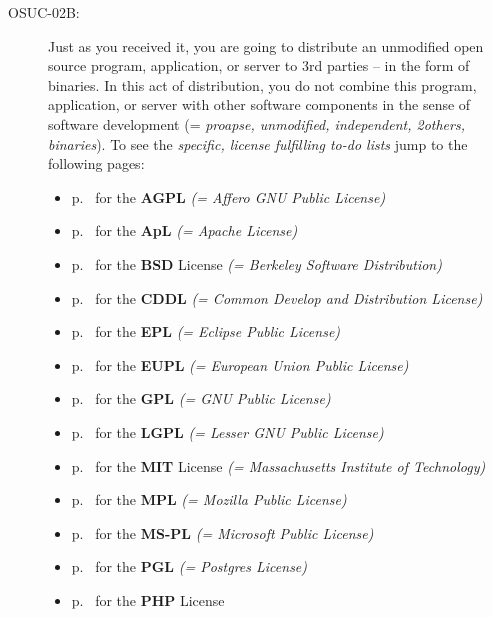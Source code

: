 \begin{description}
\item[OSUC-02B:]\label{OSUC-02B-DEF} Just as you received it, you are going to
distribute an unmodified open source program, application, or server to 3rd
parties -- in the form of binaries. In this act of distribution, you do not
combine this program, application, or server with other software components in
the sense of software development (= \textit{proapse, unmodified, independent,
2others, binaries}). To see the \textit{specific, license fulfilling to-do
lists} jump to the following pages:
   \begin{itemize}
    \item p.\ \pageref{OSUC-02B-AGPL} for the \textbf{AGPL}
      \textit{(= Affero GNU Public License)} 
    \item p.\ \pageref{OSUC-02B-Apache20} for the \textbf{ApL}
      \textit{(= Apache License)}
    \item p.\ \pageref{OSUC-02B-BSD} for the \textbf{BSD} License
      \textit{(= Berkeley Software Distribution)}
    \item p.\ \pageref{OSUC-02B-CDDL} for the \textbf{CDDL}
      \textit{(= Common Develop and Distribution License)}  
    \item p.\ \pageref{OSUC-02B-EPL} for the \textbf{EPL}
      \textit{(= Eclipse Public License)}     
    \item p.\ \pageref{OSUC-02B-EUPL} for the \textbf{EUPL}
      \textit{(= European Union Public License)} 
    \item p.\ \pageref{OSUC-02B-GPL} for the \textbf{GPL}
       \textit{(= GNU Public License)} 
    \item p.\ \pageref{OSUC-02B-LGPL} for the \textbf{LGPL}
      \textit{(= Lesser GNU Public License)}           
    \item p.\ \pageref{OSUC-02B-MIT} for the \textbf{MIT} License
       \textit{(= Massachusetts Institute of Technology)} 
    \item p.\ \pageref{OSUC-02B-MPL} for the \textbf{MPL}
      \textit{(= Mozilla Public License)}     
    \item p.\ \pageref{OSUC-02B-MS-PL} for the \textbf{MS-PL}
      \textit{(= Microsoft Public License)} 
    \item p.\ \pageref{OSUC-02B-PGL} for the \textbf{PGL}
      \textit{(= Postgres License)} 
    \item p.\ \pageref{OSUC-02B-PHP} for the \textbf{PHP} License 
  \end{itemize}
  

\end{description}
